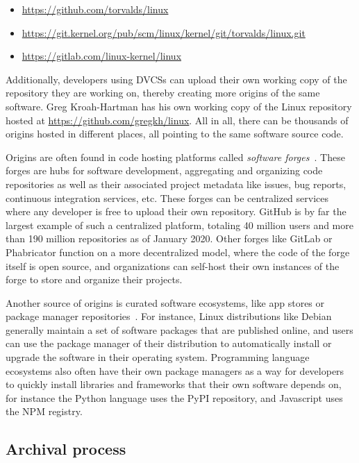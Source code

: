 \begin{itemize}[ ]
    \setlength\itemsep{-0.5em}
    \item \url{https://github.com/torvalds/linux}
    \item \url{https://git.kernel.org/pub/scm/linux/kernel/git/torvalds/linux.git}
    \item \url{https://gitlab.com/linux-kernel/linux}
\end{itemize}

Additionally, developers using \glspl{DVCS} can upload their own working copy of
the repository they are working on, thereby creating more origins of the same
software. Greg Kroah-Hartman has his own working copy of the Linux repository
hosted at \url{https://github.com/gregkh/linux}. All in all, there can be
thousands of origins hosted in different places, all pointing to the same
software source code.

Origins are often found in code hosting platforms called \emph{software
forges}~\cite{squire2012describing, DBLP:conf/wikis/Squire17}. These forges are
hubs for software development, aggregating and organizing code repositories as
well as their associated project metadata like issues, bug reports, continuous
integration services, etc.  These forges can be centralized services where any
developer is free to upload their own repository. GitHub is by far the largest
example of such a centralized platform, totaling 40 million users and more than
190 million repositories as of January 2020. Other forges like GitLab or
Phabricator function on a more decentralized model, where the code of the forge
itself is open source, and organizations can self-host their own instances of
the forge to store and organize their projects.

Another source of origins is curated software ecosystems, like app stores or
package manager repositories~\cite{DBLP:conf/msr/KikasGDP17,
DBLP:conf/msr/AbateCGFTZ15}. For instance, Linux distributions like Debian
generally maintain a set of software packages that are published online, and
users can use the package manager of their distribution to automatically
install or upgrade the software in their operating system. Programming language
ecosystems also often have their own package managers as a way for developers
to quickly install libraries and frameworks that their own software depends on,
for instance the Python language uses the PyPI repository, and Javascript uses
the NPM registry.

\subsection{Archival process}

